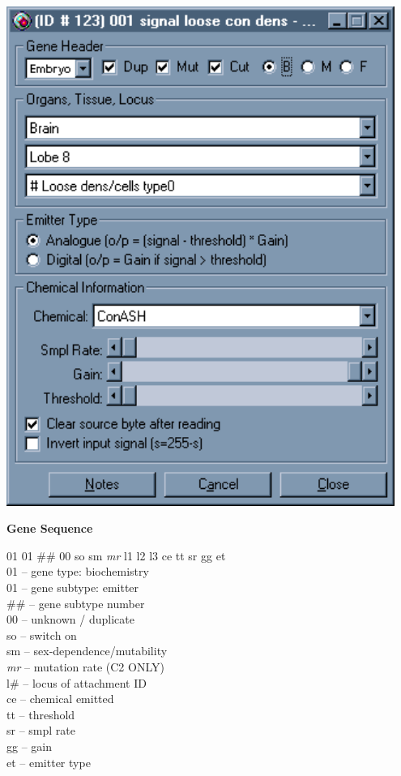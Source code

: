 \documentclass[11pt,twoside,a4paper]{article}
\begin{document}
\begin{minipage}[ht]{0.40\textwidth}
	\includegraphics[width=0.95\textwidth]{img/gen11k.png}
\end{minipage} \hfill \begin{minipage}[ht]{0.575\textwidth}
	\textbf{\large Gene Sequence} %
	
	01 01 \#\# 00 so sm \emph{mr} l1 l2 l3 ce tt sr gg et ~\\

	01 -- gene type: biochemistry ~\\
	01 -- gene subtype: emitter ~\\
	\#\# -- gene subtype number ~\\
	00 -- unknown / duplicate ~\\
	so -- switch on ~\\
	sm -- sex-dependence/mutability ~\\
	\emph{mr} -- mutation rate (C2 ONLY) ~\\
	l\# -- locus of attachment ID ~\\
	ce -- chemical emitted ~\\
	tt -- threshold ~\\
	sr -- smpl rate ~\\
	gg -- gain ~\\
	et -- emitter type ~\\
\end{minipage} ~\\
\end{document}
